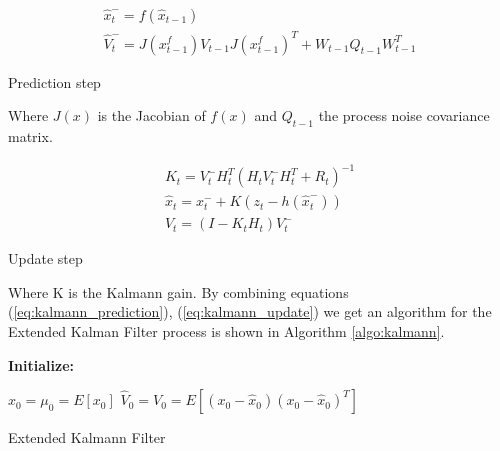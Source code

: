 \documentclass[mscthesis]{usiinfthesis}
\begin{document}
\begin{eqfloat}[H]
\begin{equation}
\begin{array}{l}
\hat{x}_t^- = f(\hat{x}_{t-1}) \\
\hat{V}_t^- = J(x^f_{t-1}) V_{t-1} J(x^f_{t-1})^T + W_{t-1} Q_{t-1} W_{t-1}^T
\end{array}
\label{eq:kalman_predict}
\end{equation}
\caption{Prediction step}
\label{eq:kalmann_prediction}
\end{eqfloat}

Where $J(x)$ is the Jacobian of $f(x)$ and $Q_{t-1}$ the process noise covariance matrix.


\begin{eqfloat}[H]
\begin{equation}
\begin{array}{l}
K_t = V_t^- H^T_t (H_t V_t^- H^T_t + R_t)^{-1} \\
\hat{x}_t = x_t^- + K (z_t - h(\hat{x}_t^-)) \\
V_t = (I-K_t H_t)V_t^-
\end{array}
\label{eq:kalman_update}
\end{equation}
\caption{Update step}
\label{eq:kalmann_update}
\end{eqfloat}

Where K is the Kalmann gain. By combining equations (\ref{eq:kalmann_prediction}), (\ref{eq:kalmann_update}) we get an algorithm for the Extended Kalman Filter process is shown in Algorithm \ref{algo:kalmann}. 

\begin{algorithm}[H]
\textbf{Initialize: }
\begin{substeps}
$\hat{x}_0 = \mu_0 = E[x_0]$ \;
$\hat{V}_0 = V_0 = E[(x_0-\hat{x}_0)(x_0-\hat{x}_0)^T]$  \;
\end{substeps}
  \caption{Extended Kalmann Filter}
  \label{algo:kalmann}
\end{algorithm}
\end{document}
